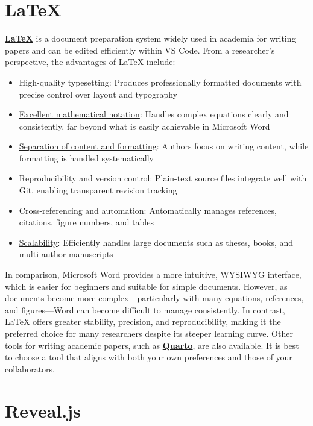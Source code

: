 \documentclass[11pt]{article}
\begin{document}

\section{LaTeX}

\href{https://github.com/Hiroki-Ando1998/LaTeX}{\textbf{LaTeX}} is a document preparation system widely used in academia for writing papers and can be edited efficiently within VS Code. 
From a researcher’s perspective, the advantages of LaTeX include:
\begin{itemize}
\item High-quality typesetting: Produces professionally formatted documents with precise control over layout and typography
\item \uline{Excellent mathematical notation}: Handles complex equations clearly and consistently, far beyond what is easily achievable in Microsoft Word
\item \uline{Separation of content and formatting}: Authors focus on writing content, while formatting is handled systematically
\item Reproducibility and version control: Plain-text source files integrate well with Git, enabling transparent revision tracking
\item Cross-referencing and automation: Automatically manages references, citations, figure numbers, and tables
\item \uline{Scalability}: Efficiently handles large documents such as theses, books, and multi-author manuscripts
\end{itemize}
In comparison, Microsoft Word provides a more intuitive, WYSIWYG interface, 
which is easier for beginners and suitable for simple documents. 
However, as documents become more complex—particularly with many equations, references, and figures—Word can become difficult to manage consistently. 
In contrast, LaTeX offers greater stability, precision, and reproducibility, 
making it the preferred choice for many researchers despite its steeper learning curve. 
Other tools for writing academic papers, such as \href{https://quarto.org/docs/download/}{\textbf{Quarto}}, 
are also available. 
It is best to choose a tool that aligns with both your own preferences and those of your collaborators.


\section{Reveal.js}
\end{document}

